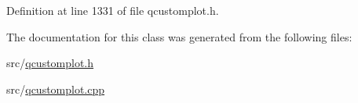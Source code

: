Definition at line 1331 of file qcustomplot.\-h.



The documentation for this class was generated from the following files\-:\begin{DoxyCompactItemize}
\item 
src/\hyperlink{qcustomplot_8h}{qcustomplot.\-h}\item 
src/\hyperlink{qcustomplot_8cpp}{qcustomplot.\-cpp}\end{DoxyCompactItemize}
